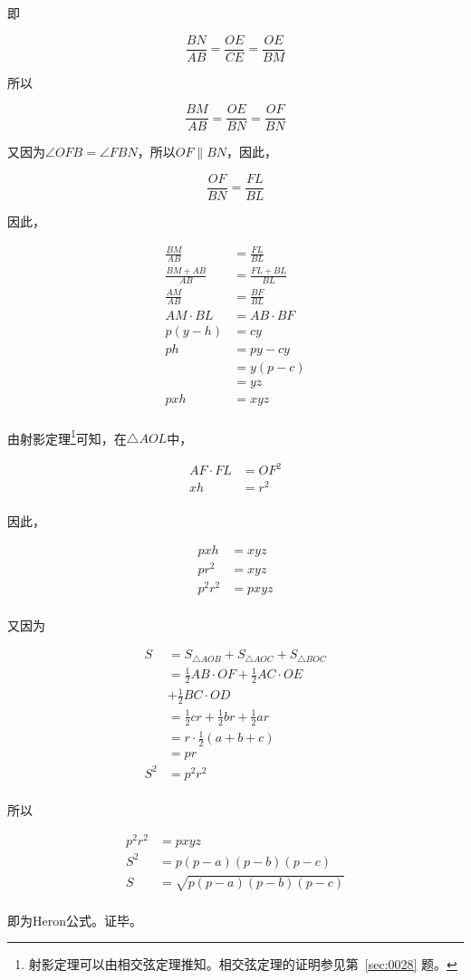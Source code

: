 即

\[ \frac{BN}{AB} = \frac{OE}{CE} = \frac{OE}{BM} \]

所以

\[ \frac{BM}{AB} = \frac{OE}{BN} = \frac{OF}{BN} \]

又因为$\angle OFB = \angle FBN$，所以$OF \parallel BN$，因此，

\[ \frac{OF}{BN} = \frac{FL}{BL} \]

因此，

\begin{align*}
  \frac{BM}{AB} &= \frac{FL}{BL} \\
  \frac{BM + AB}{AB} &= \frac{FL + BL}{BL} \\
  \frac{AM}{AB} &= \frac{BF}{BL} \\
  AM\cdot BL &= AB\cdot BF \\
  p(y - h) &= cy \\
  ph &= py - cy \\
  &= y(p - c) \\
  &= yz \\
  pxh &= xyz \\
\end{align*}

由射影定理\footnote{射影定理可以由相交弦定理推知。相交弦定理的证明参见第~\ref{sec:0028} 题。}可知，在$\triangle AOL$中，

\begin{align*}
  AF\cdot FL &= OF^2 \\
  xh &= r^2 \\
\end{align*}

因此，

\begin{align*}
  pxh &= xyz \\
  pr^2 &= xyz \\
  p^2r^2 &= pxyz \\
\end{align*}

又因为

\begin{align*}
  S &= S_{\triangle AOB} + S_{\triangle AOC} + S_{\triangle BOC} \\
  &= \frac12AB\cdot OF + \frac12AC\cdot OE \\
  &+ \frac12BC\cdot OD \\
  &= \frac12cr + \frac12br + \frac12ar \\
  &= r\cdot\frac12(a + b + c) \\
  &= pr \\
  S^2 &= p^2r^2 \\
\end{align*}

所以

\begin{align*}
  p^2r^2 &= pxyz \\
  S^2 &= p(p - a)(p - b)(p - c) \\
  S &= \sqrt{p(p - a)(p - b)(p - c)} \\
\end{align*}

即为Heron公式。证毕。

